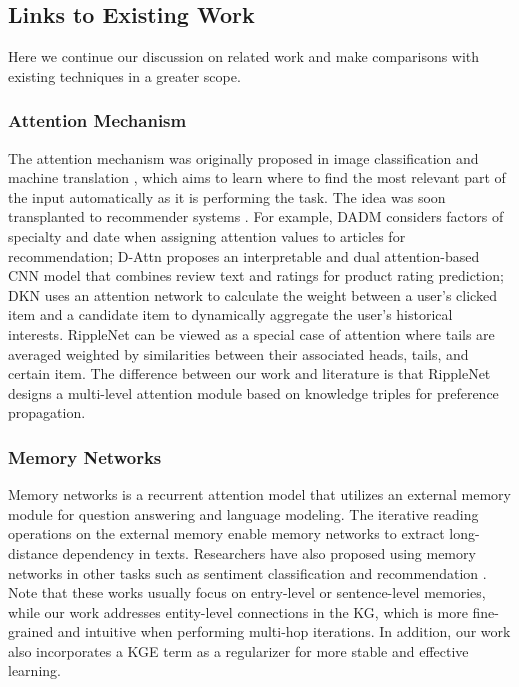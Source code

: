 \documentclass[sigconf]{acmart}
\begin{document}
	\subsection{Links to Existing Work}
		Here we continue our discussion on related work and make comparisons with existing techniques in a greater scope.
		
		\subsubsection{Attention Mechanism}
			The attention mechanism was originally proposed in image classification \cite{mnih2014recurrent} and machine translation \cite{bahdanau2014neural}, which aims to learn where to find the most relevant part of the input automatically as it is performing the task.
			The idea was soon transplanted to recommender systems \citep{wang2017dynamic,chen2017attentive,seo2017interpretable,zhou2017deep,wang2018dkn}.
			For example, DADM \cite{chen2017attentive} considers factors of specialty and date when assigning attention values to articles for recommendation;
			D-Attn \cite{seo2017interpretable} proposes an interpretable and dual attention-based CNN model that combines review text and ratings for product rating prediction;
			DKN \cite{wang2018dkn} uses an attention network to calculate the weight between a user's clicked item and a candidate item to dynamically aggregate the user's historical interests.
			RippleNet can be viewed as a special case of attention where tails are averaged weighted by similarities between their associated heads, tails, and certain item.
			The difference between our work and literature is that RippleNet designs a multi-level attention module based on knowledge triples for preference propagation.
		
		\subsubsection{Memory Networks}
			Memory networks \cite{weston2014memory,sukhbaatar2015end,miller2016key} is a recurrent attention model that utilizes an external memory module for question answering and language modeling.
			The iterative reading operations on the external memory enable memory networks to extract long-distance dependency in texts.
			Researchers have also proposed using memory networks in other tasks such as sentiment classification \cite{tai2015improved,li2017end} and recommendation \cite{huang2017mention,chen2018sequential}.
			Note that these works usually focus on entry-level or sentence-level memories, while our work addresses entity-level connections in the KG, which is more fine-grained and intuitive when performing multi-hop iterations.
			In addition, our work also incorporates a KGE term as a regularizer for more stable and effective learning.
			
\end{document}
